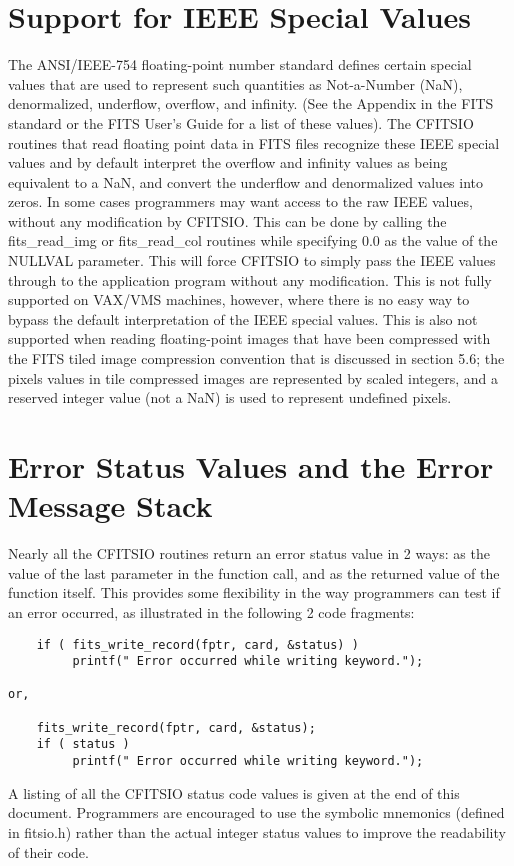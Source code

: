 \documentclass[11pt]{book}
\begin{document}
\section{Support for IEEE Special Values}

The ANSI/IEEE-754 floating-point number standard defines certain
special values that are used to represent such quantities as
Not-a-Number (NaN), denormalized, underflow, overflow, and infinity.
(See the Appendix in the FITS standard or the FITS User's
Guide for a list of these values).  The CFITSIO routines that read
floating point data in FITS files recognize these IEEE special values
and by default interpret the overflow and infinity values as being
equivalent to a NaN, and convert the underflow and denormalized values
into zeros.  In some cases programmers may want access to the raw IEEE
values, without any modification by CFITSIO.  This can be done by
calling the fits\_read\_img or fits\_read\_col routines while
specifying 0.0 as the value of the NULLVAL parameter.  This will force
CFITSIO to simply pass the IEEE values through to the application
program without any modification.  This is not fully supported on
VAX/VMS machines, however, where there is no easy way to bypass the
default interpretation of the IEEE special values.  This is also not
supported when reading floating-point images that have been compressed
with the FITS tiled image compression convention that is discussed in
section 5.6;  the pixels values in tile compressed images are
represented by scaled integers, and a reserved integer value
(not a NaN) is used to represent undefined pixels.


\section{Error Status Values and the Error Message Stack}

Nearly all the CFITSIO routines return an error status value
in 2 ways: as the value of the last parameter in the function call,
and as the returned value of the function itself.  This provides
some flexibility in the way programmers can test if an error
occurred, as illustrated in the following 2 code fragments:

\begin{verbatim}
    if ( fits_write_record(fptr, card, &status) )
         printf(" Error occurred while writing keyword.");

or,

    fits_write_record(fptr, card, &status);
    if ( status )
         printf(" Error occurred while writing keyword.");
\end{verbatim}
A listing of all the CFITSIO status code values is given at the end of
this document.  Programmers are encouraged to use the symbolic
mnemonics (defined in fitsio.h) rather than the actual integer status
values to improve the readability of their code.
\end{document}
